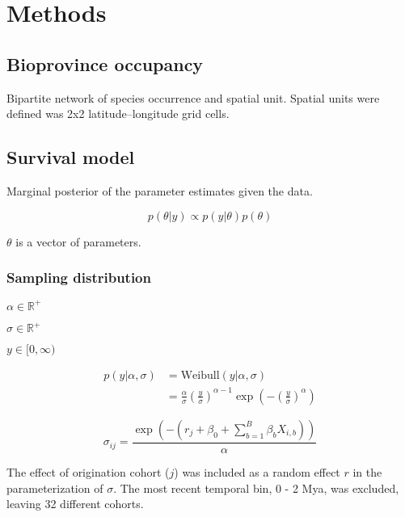\documentclass[12pt,letterpaper]{article}
\begin{document}
\section{Methods}

\subsection{Bioprovince occupancy}

Bipartite network of species occurrence and spatial unit. Spatial units were defined was 2x2 latitude--longitude grid cells.

\subsection{Survival model}

Marginal posterior of the parameter estimates given the data.

\begin{equation}
  p(\theta|y) \propto p(y|\theta) p(\theta)
  \label{eq:bayes}
\end{equation}

\(\theta\) is a vector of parameters.

\subsubsection{Sampling distribution}

\(\alpha \in \mathbb{R}^{+}\)

\(\sigma \in \mathbb{R}^{+}\)

\(y \in [0, \infty)\)

\begin{align}
  p(y|\alpha, \sigma) &= \mathrm{Weibull}(y|\alpha, \sigma) \nonumber \\ 
  &= \frac{\alpha}{\sigma} \left(\frac{y}{\sigma}\right)^{\alpha - 1} \exp\left(-\left(\frac{y}{\sigma}\right)^{\alpha}\right)
  \label{eq:weibull}
\end{align}

\begin{equation}
  \sigma_{ij} = \frac{\exp(-(r_{j} + \beta_{0} + \sum_{b = 1}^{B} \beta_{b} X_{i,b}))}{\alpha}
  \label{eq:reg}
\end{equation}

The effect of origination cohort (\(j\)) was included as a random effect \(r\) in the parameterization of \(\sigma\). The most recent temporal bin, 0 - 2 Mya, was excluded, leaving 32 different cohorts. 
\end{document}
